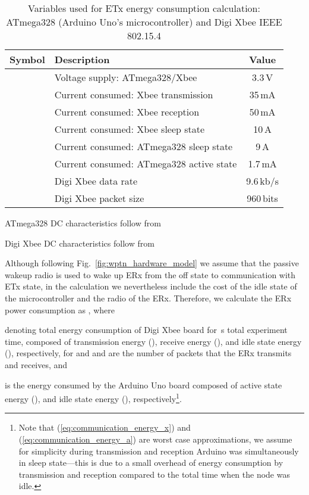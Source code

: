 \documentclass[11pt,draftclsnofoot,journal,onecolumn]{IEEEtran}
\begin{document}
\begin{table}
\centering
\begin{threeparttable}
\caption{Variables used for ETx energy consumption calculation: ATmega328 (Arduino Uno's microcontroller) and Digi Xbee IEEE 802.15.4}
\label{table:hardware_variable_table}
\scriptsize
\begin{tabular}{| c | l | c |}
\hline
Symbol & Description & Value \\
\hline\hline
 & Voltage supply: ATmega328/Xbee & 3.3\,V \\
 & Current consumed: Xbee transmission & 35\,mA \\
 & Current consumed: Xbee reception & 50\,mA \\
 & Current consumed: Xbee sleep state & 10\,A \\
 & Current consumed: ATmega328 sleep state & 9\,A \\
 & Current consumed: ATmega328 active state & 1.7\,mA \\
 & Digi Xbee data rate & 9.6\,kb/s \\
 & Digi Xbee packet size & 960\,bits \\
\hline
\end{tabular}
\begin{tablenotes}
\item ATmega328 DC characteristics follow from~\cite[Table 29-7]{avr_data_sheet}
\item Digi Xbee DC characteristics follow from~\cite{xbee_data_sheet}
\end{tablenotes}
\end{threeparttable}
\end{table}

Although following Fig.~\ref{fig:wptn_hardware_model} we assume that the passive wakeup radio is used to wake up ERx from the off state to communication with ETx state, in the calculation we nevertheless include the cost of the idle state of the microcontroller and the radio of the ERx. Therefore, we calculate the ERx power consumption as , where

denoting total energy consumption of Digi Xbee board for \,s total experiment time, composed of transmission energy (), receive energy (), and idle state energy (), respectively, for and  and  are the number of packets that the ERx transmits and receives, and

is the energy consumed by the Arduino Uno board composed of active state energy (), and idle state energy (), respectively\footnote{Note that (\ref{eq:communication_energy_x}) and (\ref{eq:communication_energy_a}) are worst case approximations, we assume for simplicity during transmission and reception Arduino was simultaneously in sleep state---this is due to a small overhead of energy consumption by transmission and reception compared to the total time when the node was idle.}.
\end{document}
